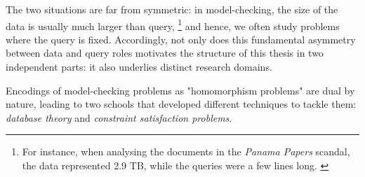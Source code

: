 The two situations are far from symmetric: in model-checking, the size of the
data is usually much larger than query,%
\footnote{For instance, when analysing the documents in the \emph{Panama Papers} scandal,
the data represented 2.9 TB, while the queries were a few lines long. \cite{Neo4jPanama}}
and hence, we often study problems where the query is fixed.
Accordingly, not only does this fundamental asymmetry between data and query roles motivates the structure of this thesis in two independent parts: it also underlies distinct research domains.

\begin{known}
	Encodings of model-checking problems as "homomorphism problems" are dual by nature,
	leading to two schools that developed different techniques to tackle them:
	\emph{database theory} and \emph{constraint satisfaction problems}.
\end{known}


